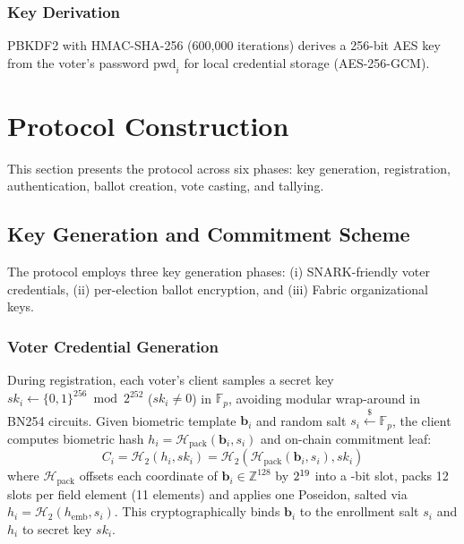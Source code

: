 \documentclass[10pt,letterpaper,journal]{IEEEtran}
\begin{document}
\subsubsection{Key Derivation}
PBKDF2 with HMAC-SHA-256 (600,000 iterations) derives a 256-bit AES key from the voter's password $\text{pwd}_i$ for local credential storage (AES-256-GCM).



\section{Protocol Construction}
\label{sec:protocol_construction}

This section presents the protocol across six phases: key generation, registration, authentication, ballot creation, vote casting, and tallying.

\subsection{Key Generation and Commitment Scheme}
The protocol employs three key generation phases: (i) SNARK-friendly voter credentials, (ii) per-election ballot encryption, and (iii) Fabric organizational keys.

\subsubsection{Voter Credential Generation}
During registration, each voter's client samples a secret key $sk_i \leftarrow \{0,1\}^{256} \bmod 2^{252}$ ($sk_i \neq 0$) in $\mathbb{F}_p$, avoiding modular wrap-around in BN254 circuits. Given biometric template $\mathbf{b}_i$ and random salt $s_i \xleftarrow{\$} \mathbb{F}_p$, the client computes biometric hash $h_i = \mathcal{H}_{\text{pack}}(\mathbf{b}_i, s_i)$ and on-chain commitment leaf:
\begin{equation}
\label{eq:commitment-leaf}
C_i = \mathcal{H}_2(h_i, sk_i) = \mathcal{H}_2(\mathcal{H}_{\text{pack}}(\mathbf{b}_i, s_i), sk_i)
\end{equation}
where $\mathcal{H}_{\text{pack}}$ offsets each coordinate of $\mathbf{b}_i \in \mathbb{Z}^{128}$ by $2^{19}$ into a \nRangePerCoord-bit slot, packs 12 slots per field element (11 elements) and applies one Poseidon, salted via $h_i = \mathcal{H}_2(h_{\text{emb}}, s_i)$. This cryptographically binds $\mathbf{b}_i$ to the enrollment salt $s_i$ and $h_i$ to secret key $sk_i$.
\end{document}
